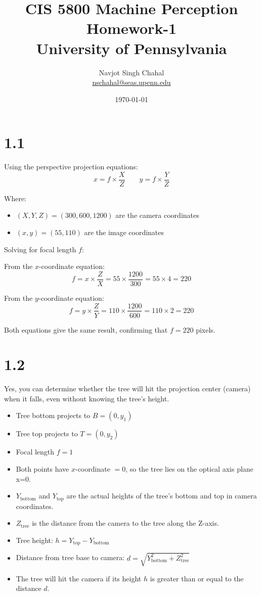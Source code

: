 \documentclass[12pt]{article}
\title{CIS 5800 Machine Perception Homework-1 \\ University of Pennsylvania}
\author{Navjot Singh Chahal \\ \href{mailto:nschahal@seas.upenn.edu}{nschahal@seas.upenn.edu}}
\date{\today}
\begin{document}
\maketitle

\section*{1.1}
Using the perspective projection equations:
\[
x = f \times \frac{X}{Z}
\qquad
y = f \times \frac{Y}{Z}
\]

Where:
\begin{itemize}
    \item $(X, Y, Z) = (300, 600, 1200)$ are the camera coordinates
    \item $(x, y) = (55, 110)$ are the image coordinates
\end{itemize}

Solving for focal length $f$:

From the $x$-coordinate equation:
\[
f = x \times \frac{Z}{X} = 55 \times \frac{1200}{300} = 55 \times 4 = 220
\]

From the $y$-coordinate equation:
\[
f = y \times \frac{Z}{Y} = 110 \times \frac{1200}{600} = 110 \times 2 = 220
\]

Both equations give the same result, confirming that $f = 220$ pixels.

\section*{1.2}
Yes, you can determine whether the tree will hit the projection center (camera) when it falls, even without knowing the tree's height.


\begin{itemize}
    \item Tree bottom projects to $B = (0, y_1)$
    \item Tree top projects to $T = (0, y_2)$
    \item Focal length $f = 1$
    \item Both points have $x$-coordinate $= 0$, so the tree lies on the optical axis plane x=0.
    \item $Y_\text{bottom}$ and $Y_\text{top}$ are the actual heights of the tree's bottom and top in camera coordinates.
    \item $Z_\text{tree}$ is the distance from the camera to the tree along the Z-axis.
    \item Tree height: $h = Y_\text{top} - Y_\text{bottom}$
    \item Distance from tree base to camera: $d = \sqrt{Y_\text{bottom}^2 + Z_\text{tree}^2}$
    \item The tree will hit the camera if its height $h$ is greater than or equal to the distance $d$.
\end{itemize}
\end{document}
